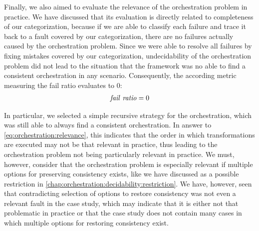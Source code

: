 
Finally, we also aimed to evaluate the relevance of the orchestration problem in practice.
We have discussed that its evaluation is directly related to completeness of our categorization, because if we are able to classify each failure and trace it back to a fault covered by our categorization, there are no failures actually caused by the orchestration problem.
Since we were able to resolve all failures by fixing mistakes covered by our categorization, undecidability of the orchestration problem did not lead to the situation that the \vitruv framework was no able to find a consistent orchestration in any scenario.
Consequently, the according metric measuring the fail ratio evaluates to $0$:
\begin{align*}
    \mathit{fail\ ratio} = 0
\end{align*}

In particular, we selected a simple recursive strategy for the orchestration, which was still able to always find a consistent orchestration.
In answer to \autoref{eq:orchestration:relevance}, this indicates that the order in which transformations are executed may not be that relevant in practice, thus leading to the orchestration problem not being particularly relevant in practice.
We must, however, consider that the orchestration problem is especially relevant if multiple options for preserving consistency exists, like we have discussed as a possible restriction in \autoref{chap:orchestration:decidability:restriction}.
We have, however, seen that contradicting selection of options to restore consistency was not even a relevant fault in the case study, which may indicate that it is either not that problematic in practice or that the case study does not contain many cases in which multiple options for restoring consistency exist.


